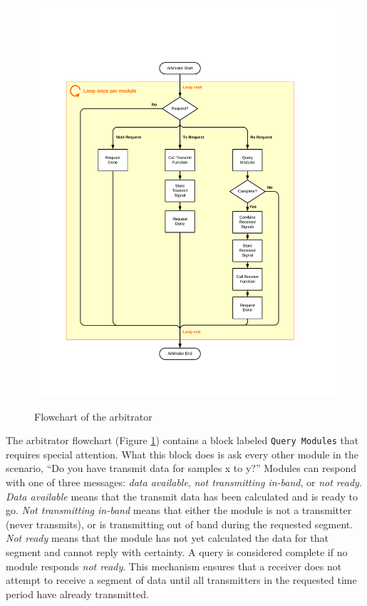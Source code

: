 \begin{figure}[!h]
\centering
\includegraphics[height=6in]{figs/Arbitrator_Flowchart}
\caption{Flowchart of the arbitrator}
\label{fig:arbitFlowchart}
\end{figure}

The arbitrator flowchart (Figure \ref{fig:arbitFlowchart}) contains
a block labeled \verb+Query Modules+ that requires special
attention. What this block does is ask every other module in the
scenario, ``Do you have transmit data for samples x to y?'' Modules
can respond with one of three messages: \emph{data available},
\emph{not transmitting in-band}, or \emph{not ready}. \emph{Data
available} means that the transmit data has been calculated and is
ready to go. \emph{Not transmitting in-band} means that either the
module is not a transmitter (never transmits), or is transmitting
out of band during the requested segment. \emph{Not ready} means
that the module has not yet calculated the data for that segment and
cannot reply with certainty.  A query is considered complete if no
module responds \emph{not ready}.  This mechanism ensures that a
receiver does not attempt to receive a segment of data until all
transmitters in the requested time period have already transmitted.

